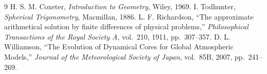 \documentclass[11pt]{article}
\theoremstyle{remark}
\begin{document}
\begin{thebibliography}{9}
 H. S. M. Coxeter, \emph{Introduction to Geometry}, Wiley, 1969.
 I. Todhunter, \emph{Spherical Trigonometry}, Macmillan, 1886.
 L. F. Richardson, ``The approximate arithmetical solution by finite
differences of physical problems,'' \emph{Philosophical Transactions of the Royal Society A},
vol.~210, 1911, pp.~307--357.
 D. L. Williamson, ``The Evolution of Dynamical Cores for Global
Atmospheric Models,'' \emph{Journal of the Meteorological Society of Japan}, vol.~85B, 2007,
pp.~241--269.
\end{thebibliography}
\end{document}

